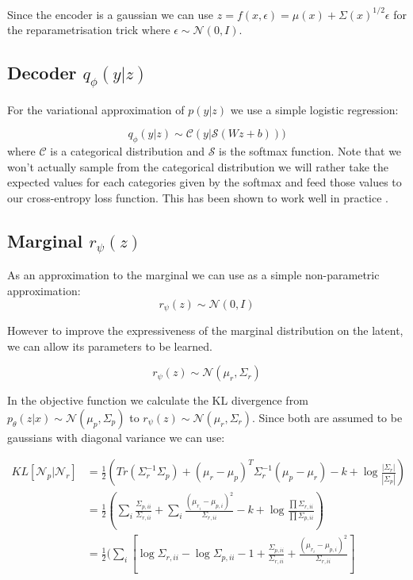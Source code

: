\documentclass[11pt,oneside,openright]{report}
\begin{document}
Since the encoder is a gaussian we can use  $z = f(x, \epsilon) =  \mu(x) + \Sigma(x)^{1/2} \epsilon$ for the reparametrisation trick where $\epsilon \sim \mathcal{N}(0, I)$. 
 
\subsection{Decoder $q_\phi(y|z)$}
For the variational approximation of $p(y|z)$ we use a simple logistic regression:

$$ q_\phi(y|z) \sim \mathcal{C}(y| \mathcal{S}(Wz + b)))$$ where $\mathcal{C}$ is a categorical distribution and $\mathcal{S}$ is the softmax function. Note that we won't actually sample from the categorical distribution we will rather take the expected values for each categories given by the softmax and feed those values to our cross-entropy loss function. This has been shown to work well in practice \cite{draw}.

\subsection{Marginal $r_\psi(z)$}

As an approximation to the marginal we can use as a simple non-parametric approximation:
$$r_\psi(z) \sim \mathcal{N}(0, I)$$

However to improve the expressiveness of the marginal distribution on the latent, we can allow its parameters to be learned. 

$$r_\psi(z) \sim \mathcal{N}(\mu_r, \Sigma_r)$$

In the objective function we calculate the KL divergence from $p_\theta(z|x) \sim \mathcal{N}(\mu_p, \Sigma_p)$ to $r_\psi(z) \sim \mathcal{N}(\mu_r, \Sigma_r)$. Since both are assumed to be gaussians with diagonal variance we can use:

\begin{align}
KL[\mathcal{N}_p| \mathcal{N}_r] &= \frac{1}{2}(Tr(\Sigma_r^{-1}\Sigma_p) + (\mu_r - \mu_p)^T\Sigma_r^{-1}(\mu_p - \mu_r) - k + \log\frac{|\Sigma_r|}{|\Sigma_p|})\\
&= \frac{1}{2}(\sum_i \frac{\Sigma_{p, ii}}{\Sigma_{r, ii}} + \sum_i \frac{(\mu_{r_i} - \mu_{p, i})^2}{\Sigma_{r, ii}} - k + \log\frac{\prod \Sigma_{r, ii}}{\prod \Sigma_{p, ii}})\\
&= \frac{1}{2}(\sum_i[ \log \Sigma_{r, ii} - \log \Sigma_{p, ii} - 1 + \frac{\Sigma_{p, ii}}{\Sigma_{r, ii}} + \frac{(\mu_{r_i} - \mu_{p, i})^2}{\Sigma_{r, ii}}]
\end{align}
\end{document}
